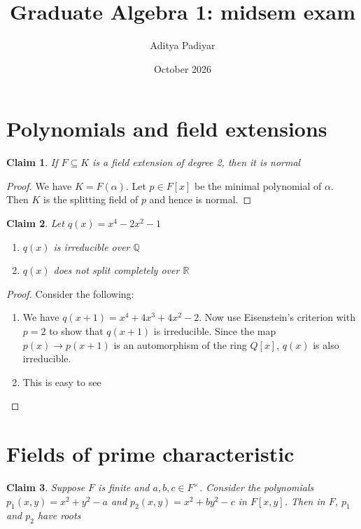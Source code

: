 \documentclass[a4paper,11pt]{article}
\title{Graduate Algebra 1: midsem exam}
\author{Aditya Padiyar}
\date{October 2026}
\newtheorem{claim}{Claim}
\begin{document}
\maketitle

\section{Polynomials and field extensions}

\begin{claim}
  If $F \subseteq K$ is a field extension of degree 2, then it is normal
\end{claim}

\begin{proof}
  We have $K=F(\alpha)$. Let $p \in F[x]$ be the minimal polynomial of $\alpha$. Then $K$ is the splitting field of $p$ and hence is normal.
\end{proof}

\begin{claim}
  Let $q(x)=x^4-2x^2-1$
  \begin{enumerate}
    \item $q(x)$ is irreducible over $\mathbb{Q}$
    \item $q(x)$ does not split completely over $\mathbb{R}$
  \end{enumerate}
\end{claim}

\begin{proof}
  Consider the following:
  \begin{enumerate}
    \item We have $q(x+1)=x^4+4x^3+4x^2-2$. Now use Eisenstein's criterion with $p=2$ to show that $q(x+1)$ is irreducible. 
          Since the map $p(x) \to p(x+1)$ is an automorphism of the ring $Q[x]$, $q(x)$ is also irreducible.
    \item This is easy to see
  \end{enumerate}
\end{proof}

\section{Fields of prime characteristic}

\begin{claim}
  Suppose $F$ is finite and $a,b,c \in F^\times$. Consider the polynomials $p_1(x,y)=x^2+y^2-a$ and $p_2(x,y)=x^2+by^2-c$ in $F[x,y]$. Then in $F$, $p_1$ and $p_2$ have roots
\end{claim}
\end{document}
